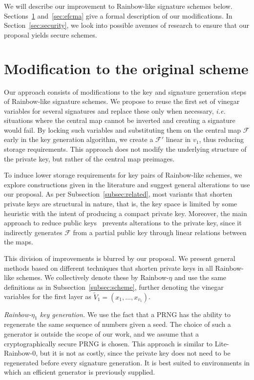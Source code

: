 \documentclass[openright]{report}
\begin{document}
We will describe our improvement to Rainbow-like signature schemes below.
Sections~\ref{sec:scheme} and~\ref{sec:efcma} give a formal description
of our modifications. In Section~\ref{sec:security}, we look into 
possible avenues of research to ensure that our proposal yields secure
schemes.

\section{Modification to the original scheme}\label{sec:scheme}

Our approach consists of modifications to the key and signature generation
steps of Rainbow-like signature schemes. We propose to reuse the first set of
vinegar variables for several signatures and replace these only when necessary,
\emph{i.e.} situations where the central map cannot be inverted and creating a
signature would fail. By locking such variables and substituting them on the
central map $\mathcal{F}$ early in the key generation algorithm, we create a
$\mathcal{F}'$ linear in $v_{1}$, thus reducing storage requirements. This
approach does not modify the underlying structure of the private key, but
rather of the central map preimages.

To induce lower storage requirements for key pairs of Rainbow-like schemes, we
explore constructions given in the literature and suggest general alterations
to use our proposal. As per Subsection~\ref{subsec:related}, most variants that
shorten private keys are structural in nature, that is, the key space is
limited by some heuristic with the intent of producing a compact private key.
Moreover, the main approach to reduce public keys~\cite{Petzoldt:201307:phd}
prevents alterations to the private key,
since it indirectly generates $\mathcal{F}$ from a partial public key through
linear relations between the maps.

This division of improvements is blurred by our proposal. We present general
methods based on different techniques that shorten private keys in all
Rainbow-like schemes. We collectively denote these by Rainbow-$\eta$ and use
the same definitions as in Subsection~\ref{subsec:scheme}, further denoting
the vinegar variables for the first layer as
$\widetilde{V}_{1} = (x_{1}, \dots, x_{v_{1}})$.

\emph{Rainbow-$\eta_{1}$ key generation.}
We use the fact that a PRNG has the ability to regenerate the same sequence of
numbers given a seed. The choice of such a generator is outside the scope of
our work, and we assume that a cryptographically secure PRNG is chosen. This
approach is similar to Lite-Rainbow-0, but it is not as costly, since the
private key does not need to be regenerated before every signature generation.
It is best suited to environments in which an efficient generator is previously
supplied.
\end{document}
